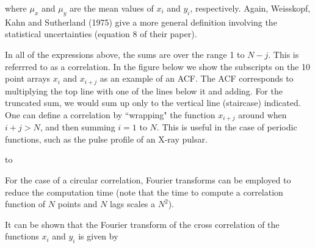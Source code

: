 {\list

where $\mu_x$ and $\mu_y$ are the mean values of $x_i$ and $y_i$,
respectively.  Again, Weisskopf, Kahn and Sutherland (1975) give a more
general definition involving the statistical uncertainties (equation 8
of their paper).

In all of the expressions above, the sums are over the range 1 to $N-j$.  This
is referrred to as a  correlation.  In the figure below we show the
subscripts on the 10 point arrays $x_i$ and $x_{i+j}$ as an example of an ACF.
The ACF corresponds to multiplying the top line with one of the lines below it
and adding.  For the truncated sum, we would sum up only to the vertical line
(staircase) indicated.  One can define a 
 correlation by ``wrapping" the
function $x_{i+j}$ around when $i+j > N$, and then summing $i = 1$ to $N$.  This is
useful in the case of periodic functions, such as the pulse profile of an X-ray
pulsar.

}

\vskip 12pt
\hbox to 

\vskip 16pt

{\list

For the case of a circular correlation, Fourier transforms can be employed
to reduce the computation time (note that the time to compute a correlation
function of $N$ points and $N$ lags scales a $N^2$).

It can be shown that the
Fourier transform of the cross correlation of the functions $x_i$
and $y_i$ is given by

}

